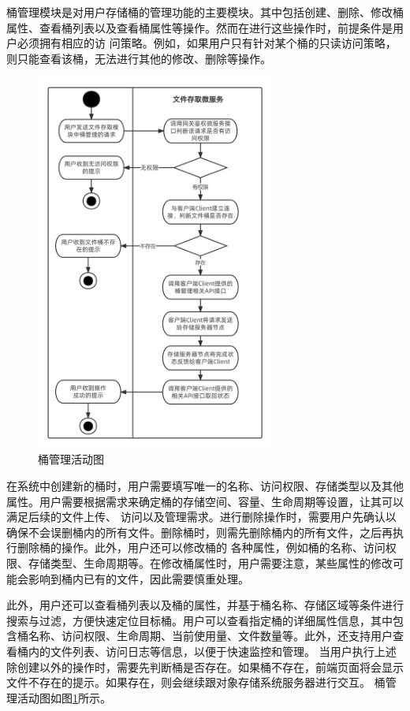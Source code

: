 桶管理模块是对用户存储桶的管理功能的主要模块。其中包括创建、删除、修改桶属性、查看桶列表以及查看桶属性等操作。然而在进行这些操作时，前提条件是用户必须拥有相应的访
问策略。例如，如果用户只有针对某个桶的只读访问策略，则只能查看该桶，无法进行其他的修改、删除等操作。
\begin{figure}[htb]
    \centering
    \includegraphics[width=0.7\textwidth]{my_figures/chapter4/桶管理活动图.png}
    \caption{桶管理活动图}
    \label{fig:桶管理活动图}
\end{figure}

在系统中创建新的桶时，用户需要填写唯一的名称、访问权限、存储类型以及其他属性。用户需要根据需求来确定桶的存储空间、容量、生命周期等设置，让其可以满足后续的文件上传、
访问以及管理需求。进行删除操作时，需要用户先确认以确保不会误删桶内的所有文件。删除桶时，则需先删除桶内的所有文件，之后再执行删除桶的操作。此外，用户还可以修改桶的
各种属性，例如桶的名称、访问权限、存储类型、生命周期等。在修改桶属性时，用户需要注意，某些属性的修改可能会影响到桶内已有的文件，因此需要慎重处理。

此外，用户还可以查看桶列表以及桶的属性，并基于桶名称、存储区域等条件进行搜索与过滤，方便快速定位目标桶。用户可以查看指定桶的详细属性信息，其中包含桶名称、访问权限、生命周期、当前使用量、文件数量等。此外，还支持用户查看桶内的文件列表、访问日志等信息，以便于快速监控和管理。
当用户执行上述除创建以外的操作时，需要先判断桶是否存在。如果桶不存在，前端页面将会显示文件不存在的提示。如果存在，则会继续跟对象存储系统服务器进行交互。
桶管理活动图如图\ref{fig:桶管理活动图}所示。




